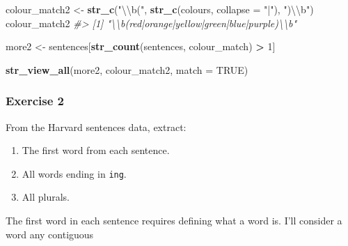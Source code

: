 \documentclass[]{book}
\newenvironment{Shaded}{\begin{snugshade}}{\end{snugshade}}
\newcommand{\CharTok}[1]{\textcolor[rgb]{0.31,0.60,0.02}{#1}}
\newcommand{\CommentTok}[1]{\textcolor[rgb]{0.56,0.35,0.01}{\textit{#1}}}
\newcommand{\DataTypeTok}[1]{\textcolor[rgb]{0.13,0.29,0.53}{#1}}
\newcommand{\DecValTok}[1]{\textcolor[rgb]{0.00,0.00,0.81}{#1}}
\newcommand{\KeywordTok}[1]{\textcolor[rgb]{0.13,0.29,0.53}{\textbf{#1}}}
\newcommand{\NormalTok}[1]{#1}
\newcommand{\OperatorTok}[1]{\textcolor[rgb]{0.81,0.36,0.00}{\textbf{#1}}}
\newcommand{\OtherTok}[1]{\textcolor[rgb]{0.56,0.35,0.01}{#1}}
\newcommand{\StringTok}[1]{\textcolor[rgb]{0.31,0.60,0.02}{#1}}
\providecommand{\tightlist}{%
  \setlength{\itemsep}{0pt}\setlength{\parskip}{0pt}}
\theoremstyle{definition}
\theoremstyle{definition}
\theoremstyle{definition}
\theoremstyle{remark}
\begin{document}
\begin{Shaded}
\begin{Highlighting}[]
\NormalTok{colour_match2 <-}\StringTok{ }\KeywordTok{str_c}\NormalTok{(}\StringTok{"}\CharTok{\textbackslash{}\textbackslash{}}\StringTok{b("}\NormalTok{, }\KeywordTok{str_c}\NormalTok{(colours, }\DataTypeTok{collapse =} \StringTok{"|"}\NormalTok{), }\StringTok{")}\CharTok{\textbackslash{}\textbackslash{}}\StringTok{b"}\NormalTok{)}
\NormalTok{colour_match2}
\CommentTok{#> [1] "\textbackslash{}\textbackslash{}b(red|orange|yellow|green|blue|purple)\textbackslash{}\textbackslash{}b"}
\end{Highlighting}
\end{Shaded}

\begin{Shaded}
\begin{Highlighting}[]
\NormalTok{more2 <-}\StringTok{ }\NormalTok{sentences[}\KeywordTok{str_count}\NormalTok{(sentences, colour_match) }\OperatorTok{>}\StringTok{ }\DecValTok{1}\NormalTok{]}
\end{Highlighting}
\end{Shaded}

\begin{Shaded}
\begin{Highlighting}[]
\KeywordTok{str_view_all}\NormalTok{(more2, colour_match2, }\DataTypeTok{match =} \OtherTok{TRUE}\NormalTok{)}
\end{Highlighting}
\end{Shaded}

\hypertarget{exercise-2-31}{%
\subsubsection{Exercise 2}\label{exercise-2-31}}

From the Harvard sentences data, extract:

\begin{enumerate}
\def\labelenumi{\arabic{enumi}.}
\tightlist
\item
  The first word from each sentence.
\item
  All words ending in \texttt{ing}.
\item
  All plurals.
\end{enumerate}

The first word in each sentence requires defining what a word is. I'll
consider a word any contiguous

\begin{Shaded}
\end{Shaded}
\end{document}
